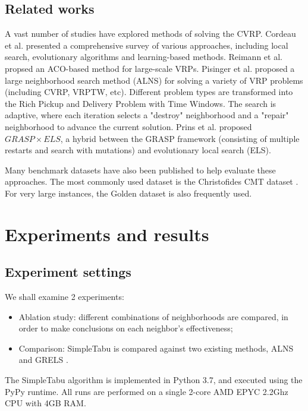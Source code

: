 \documentclass[12pt]{report}
\begin{document}
\section{Related works}
A vast number of studies have explored methods of solving the CVRP. Cordeau et al. \cite{cordeau2005new} presented a comprehensive survey of various approaches, including local search, evolutionary algorithms and learning-based methods. Reimann et al. \cite{reimann2004d} propsed an ACO-based method for large-scale VRPs. Pisinger et al. \cite{pisinger2007general} proposed a large neighborhood search method (ALNS) for solving a variety of VRP problems (including CVRP, VRPTW, etc). Different problem types are transformed into the Rich Pickup and Delivery Problem with Time Windows. The search is adaptive, where each iteration selects a "destroy" neighborhood and a "repair" neighborhood to advance the current solution. Prins et al. \cite{prins2009grasp} proposed $GRASP \times ELS$, a hybrid between the GRASP framework (consisting of multiple restarts and search with mutations) and evolutionary local search (ELS).

Many benchmark datasets have also been published to help evaluate these approaches. The most commonly used dataset is the Christofides CMT dataset \cite{christofides1976vehicle}. For very large instances, the Golden \cite{golden1998metaheuristics} dataset is also frequently used.

\chapter{Experiments and results}
\section{Experiment settings}
We shall examine 2 experiments:
\begin{itemize}
	\item Ablation study: different combinations of neighborhoods are compared, in order to make conclusions on each neighbor's effectiveness;
	\item Comparison: SimpleTabu is compared against two existing methods, ALNS \cite{pisinger2007general} and GRELS \cite{prins2009grasp}.
\end{itemize}

The SimpleTabu algorithm is implemented in Python 3.7, and executed using the PyPy \cite{rigo2006pypy} runtime. All runs are performed on a single 2-core AMD EPYC 2.2Ghz CPU with 4GB RAM.
\end{document}
